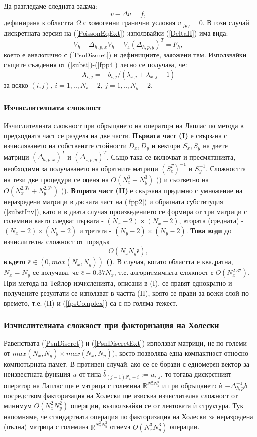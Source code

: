 \documentclass[a4paper]{article}
\newcommand{\be}{\begin{equation}}
\newcommand{\ee}{\end{equation}}
\newcommand{\rf}[1]{(\ref{#1})}
\newcommand{\RR}{\mathbb{R}}
\theoremstyle{remark}
\begin{document}
\begin{large}
Да разгледаме следната задача:
\be\label{PoissonEqExt}
v-\Delta v = f,
\ee
дефинирана в областта $\Omega$ с хомогенни гранични условия $v \big|_{\partial\Omega} = 0$. В този случай дискретната версия на \rf{PoissonEqExt} използвайки \rf{DeltaH} има вида:
\be\label{PsnDiscretExt}
V_h - \Delta_{h,p,x}  V_h - V_h  (\Delta_{h,p,y}) ^{T}  = F_h,
\ee
което е аналогично с \rf{PsnDiscret} и дефинициите, заложени там. Използвайки същите съждения от \rf{subst}-\rf{fpp4} лесно се получава, че:
\be\label{fpp4Ext}
X_{i,j} = - b_{i,j}/(\lambda_{x,i}  + \lambda_{x,j} -1)
\ee
за всяко $(i,j)$, $i = 1,..,N_x-2$, $j = 1,..,N_y-2 $.
\subsubsection{Изчислителната сложност}
Изчислителната сложност при обръщането на оператора на Лаплас по метода в предходната част се разделя на две части. \textbf{ Първата част (I)} е свързана с изчисляването на собствените стойности $D_x, D_y$ и вектори $S_x, S_y$ на двете матрици $(\Delta_{h,p,x})^T$ и $(\Delta_{h,p,y})^T$. Също така се включват и пресмятанията, необходими за получаването на обратните матрици $(S_x^T)^{-1}$ и $S_y^{-1}$. Сложността на тези две процедури се оценя на $O(N_x^3+N_y^3)$ (\cite{ref260}) и съответно на $O(N_x^{2.37}+N_y^{2.37})$ (\cite{ref27}). \textbf{Втората част (II)} е свързана предимно с умножение на неразредени матрици в дясната част на \rf{fpp2} и обратната субституция \rf{substInv}, като и в двата случая произведението се формира от три матрици  с големини както следва: първата - $(N_x-2) \times (N_x-2)$, втората (средната) - $(N_x-2) \times (N_y-2)$ и третата - $(N_y-2) \times (N_y-2)$. \textbf{Това води} до изчислителна сложност от порядък
\be\label{fpsComplex}
O(N_x N_y \bar{\epsilon}),
\ee
\textbf{където $\bar{\epsilon} \in (0, max(N_x, N_y))$ (\cite{ref26, ref27})}. В случая, когато областта е квадратна, $N_x = N_y$ се получава, че $\bar{\epsilon} = 0.37 N_x$, т.е. алгоритмичната сложност е $O(N_x^{2.37})$. При метода на Тейлор изчисленията, описани в (I), се правят еднократно и получените резултати се използват в частта (II), която се прави за всеки слой по времето, т.е. (II) и \rf{fpsComplex} са с по-голяма тежест. 

\subsubsection{Изчислителната сложност при факторизация на Холески}
Равенствата \rf{PsnDiscret} и \rf{PsnDiscretExt} използват матрици, не по големи от $max(N_x, N_y) \times max(N_x, N_y))$, което позволява една компактност относно компютърната памет. В противен случай, ако се се борави с едномерен вектор за неизвестната функция $u$ от типа $\bar {b}_{(j-1)N_x + i} := u_{i,j}$, то тогава дискретният оператор на Лаплас ще е матрица с големина $\RR^{N_x^2 N_y^2}$ и при обръщането ѝ $-\Delta_{h,p}^{-1}\bar {b}$ посредством факторизация на Холески ще изисква изчислителна сложност от минимум $O(N_x^2 N_y^2)$ операции, възползвайки се от лентовата ѝ структура. Тук напомняме, че стандартната операция по факторизация на Холески за неразредена (пълна) матрица с големина $\RR^{N_x^2 N_y^2}$ отнема $O(N_x^3 N_y^3)$ операции.


\end{large}
\end{document}
